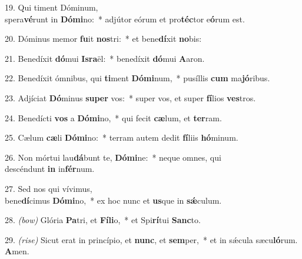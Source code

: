 19. Qui timent Dóminum,\\ spera\textbf{vé}runt in \textbf{Dó}\textbf{mi}no:~* 
	adjútor eórum et pro\textbf{téc}tor e\textbf{ó}rum est.

20. Dóminus memor \textbf{fu}it \textbf{nos}tri:~* 
	et bene\textbf{dí}xit \textbf{no}bis:

21. Benedíxit \textbf{dó}mui \textbf{Is}\textbf{ra}ël:~* 
	benedíxit \textbf{dó}mui \textbf{A}aron.

22. Benedíxit ómnibus, qui \textbf{ti}ment \textbf{Dó}\textbf{mi}num,~* 
	pusíllis \textbf{cum} ma\textbf{jó}ribus.

23. Adjíciat \textbf{Dó}minus \textbf{su}\textbf{per} vos:~* 
	super vos, et super \textbf{fí}lios \textbf{ves}tros.

24. Benedícti \textbf{vos} a \textbf{Dó}\textbf{mi}no,~* 
	qui fecit \textbf{cæ}lum, et \textbf{ter}ram.

25. Cælum \textbf{cæ}li \textbf{Dó}\textbf{mi}no:~* 
	terram autem dedit \textbf{fí}liis \textbf{hó}minum.

26. Non mórtui lau\textbf{dá}bunt te, \textbf{Dó}\textbf{mi}ne:~* 
	neque omnes, qui\\ descéndunt \textbf{in} in\textbf{fér}num.

27. Sed nos qui vívimus,\\ bene\textbf{dí}cimus \textbf{Dó}\textbf{mi}no,~* 
	ex hoc nunc et \textbf{us}que in \textbf{s\'{\ae}}culum.

28. {\color{red}\textit{(bow)}} Glória \textbf{Pa}tri, et \textbf{Fí}\textbf{li}o,~* 
	et Spi\textbf{rí}tui \textbf{Sanc}to.

29. {\color{red}\textit{(rise)}} Sicut erat in princípio, et \textbf{nunc}, et \textbf{sem}per,~* 
	et in s\'{\ae}cula sæcu\textbf{ló}rum. \textbf{A}men.
